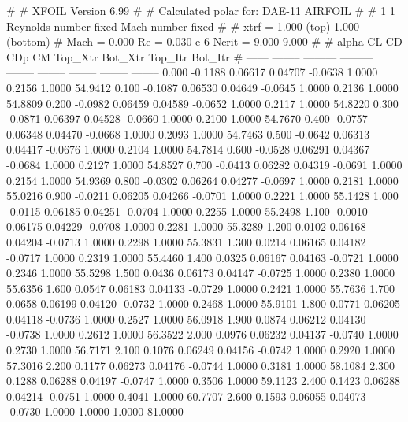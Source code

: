 #  
#       XFOIL         Version 6.99
#  
# Calculated polar for: DAE-11 AIRFOIL                                  
#  
# 1 1 Reynolds number fixed          Mach number fixed         
#  
# xtrf =   1.000 (top)        1.000 (bottom)  
# Mach =   0.000     Re =     0.030 e 6     Ncrit =   9.000  9.000
#  
#   alpha    CL        CD       CDp       CM     Top_Xtr  Bot_Xtr  Top_Itr  Bot_Itr
#  ------ -------- --------- --------- -------- -------- -------- -------- --------
   0.000  -0.1188   0.06617   0.04707  -0.0638   1.0000   0.2156   1.0000  54.9412
   0.100  -0.1087   0.06530   0.04649  -0.0645   1.0000   0.2136   1.0000  54.8809
   0.200  -0.0982   0.06459   0.04589  -0.0652   1.0000   0.2117   1.0000  54.8220
   0.300  -0.0871   0.06397   0.04528  -0.0660   1.0000   0.2100   1.0000  54.7670
   0.400  -0.0757   0.06348   0.04470  -0.0668   1.0000   0.2093   1.0000  54.7463
   0.500  -0.0642   0.06313   0.04417  -0.0676   1.0000   0.2104   1.0000  54.7814
   0.600  -0.0528   0.06291   0.04367  -0.0684   1.0000   0.2127   1.0000  54.8527
   0.700  -0.0413   0.06282   0.04319  -0.0691   1.0000   0.2154   1.0000  54.9369
   0.800  -0.0302   0.06264   0.04277  -0.0697   1.0000   0.2181   1.0000  55.0216
   0.900  -0.0211   0.06205   0.04266  -0.0701   1.0000   0.2221   1.0000  55.1428
   1.000  -0.0115   0.06185   0.04251  -0.0704   1.0000   0.2255   1.0000  55.2498
   1.100  -0.0010   0.06175   0.04229  -0.0708   1.0000   0.2281   1.0000  55.3289
   1.200   0.0102   0.06168   0.04204  -0.0713   1.0000   0.2298   1.0000  55.3831
   1.300   0.0214   0.06165   0.04182  -0.0717   1.0000   0.2319   1.0000  55.4460
   1.400   0.0325   0.06167   0.04163  -0.0721   1.0000   0.2346   1.0000  55.5298
   1.500   0.0436   0.06173   0.04147  -0.0725   1.0000   0.2380   1.0000  55.6356
   1.600   0.0547   0.06183   0.04133  -0.0729   1.0000   0.2421   1.0000  55.7636
   1.700   0.0658   0.06199   0.04120  -0.0732   1.0000   0.2468   1.0000  55.9101
   1.800   0.0771   0.06205   0.04118  -0.0736   1.0000   0.2527   1.0000  56.0918
   1.900   0.0874   0.06212   0.04130  -0.0738   1.0000   0.2612   1.0000  56.3522
   2.000   0.0976   0.06232   0.04137  -0.0740   1.0000   0.2730   1.0000  56.7171
   2.100   0.1076   0.06249   0.04156  -0.0742   1.0000   0.2920   1.0000  57.3016
   2.200   0.1177   0.06273   0.04176  -0.0744   1.0000   0.3181   1.0000  58.1084
   2.300   0.1288   0.06288   0.04197  -0.0747   1.0000   0.3506   1.0000  59.1123
   2.400   0.1423   0.06288   0.04214  -0.0751   1.0000   0.4041   1.0000  60.7707
   2.600   0.1593   0.06055   0.04073  -0.0730   1.0000   1.0000   1.0000  81.0000
